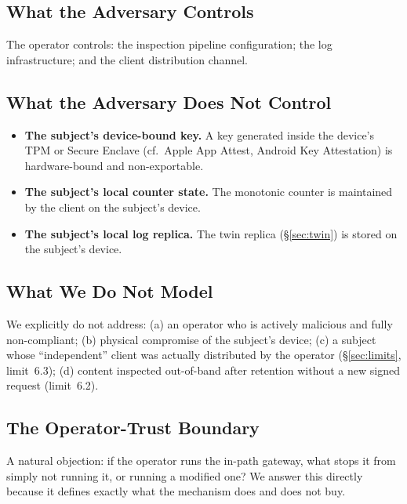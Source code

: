 \documentclass[11pt,a4paper]{article}
\begin{document}
\subsection{What the Adversary Controls}

The operator controls: the inspection pipeline configuration; the log infrastructure;
and the client distribution channel.

\subsection{What the Adversary Does Not Control}

\begin{itemize}[noitemsep]
  \item \textbf{The subject's device-bound key.} A key generated inside the device's
    TPM or Secure Enclave (cf.\ Apple App Attest, Android Key Attestation) is
    hardware-bound and non-exportable.
  \item \textbf{The subject's local counter state.} The monotonic counter is maintained
    by the client on the subject's device.
  \item \textbf{The subject's local log replica.} The twin replica (\S\ref{sec:twin})
    is stored on the subject's device.
\end{itemize}

\subsection{What We Do Not Model}

We explicitly do not address: (a) an operator who is actively malicious and fully
non-compliant; (b) physical compromise of the subject's device; (c) a subject whose
``independent'' client was actually distributed by the operator (\S\ref{sec:limits},
limit~6.3); (d) content inspected out-of-band after retention without a new signed
request (limit~6.2).

\subsection{The Operator-Trust Boundary}
\label{sec:operatortrust}

A natural objection: if the operator runs the in-path gateway, what stops it from
simply not running it, or running a modified one? We answer this directly because it
defines exactly what the mechanism does and does not buy.
\end{document}
